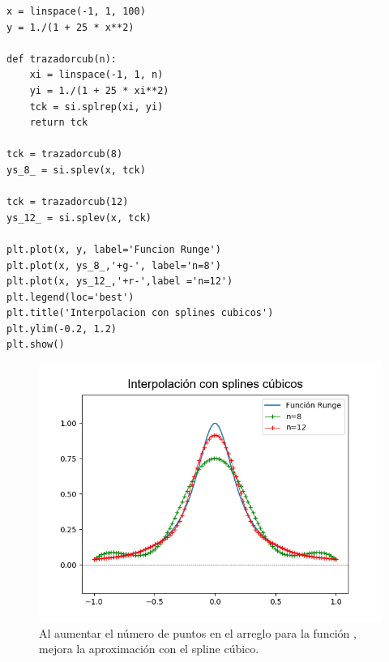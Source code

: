 {\begin{frame}
\begin{lstlisting}[caption=Código completo, style= FormattedNumber, basicstyle=\linespread{1.1}\ttfamily=\small, columns=fullflexible]
x = linspace(-1, 1, 100)
y = 1./(1 + 25 * x**2)

def trazadorcub(n):
    xi = linspace(-1, 1, n)
    yi = 1./(1 + 25 * xi**2)
    tck = si.splrep(xi, yi)
    return tck

tck = trazadorcub(8)
ys_8_ = si.splev(x, tck)

tck = trazadorcub(12)
ys_12_ = si.splev(x, tck)

plt.plot(x, y, label='Funcion Runge')
plt.plot(x, ys_8_,'+g-', label='n=8')
plt.plot(x, ys_12_,'+r-',label ='n=12')
plt.legend(loc='best')
plt.title('Interpolacion con splines cubicos')
plt.ylim(-0.2, 1.2)
plt.show()
\end{lstlisting}
\end{frame}
\begin{frame}
\begin{figure}
    \centering
    \includegraphics[scale=0.6]{Imagenes/Splines_Runge_04}
    \caption{Al aumentar el número de puntos en el arreglo para la función , mejora la aproximación con el spline cúbico.}
\end{figure}
\end{frame}
}

